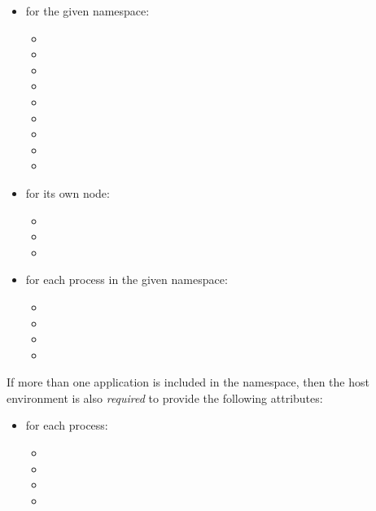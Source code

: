 \begin{itemize}
    \item for the given namespace:
        \begin{itemize}
            \item {}
            \item {}
            \item {}
            \item {}
            \item {}
            \item {}
            \item {}
            \item {}
            \item {}
        \end{itemize}
    \item for its own node:
        \begin{itemize}
            \item {}
            \item {}
            \item {}
        \end{itemize}
    \item for each process in the given namespace:
        \begin{itemize}
            \item {}
            \item {}
            \item {}
            \item {}
        \end{itemize}
\end{itemize}

If more than one application is included in the namespace, then the host environment is also \textit{required} to provide the following attributes:

\begin{itemize}
    \item for each process:
        \begin{itemize}
            \item {}
            \item {}
            \item {}
             \item {}
        \end{itemize}
\end{itemize}

